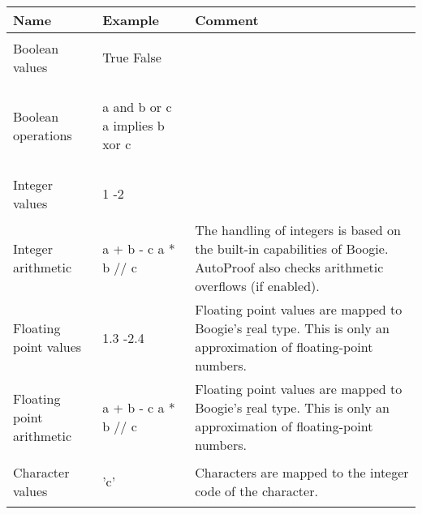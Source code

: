 \noindent
\begin{longtable}{|m{2.7cm}|l|m{6.35cm}|}
\hline
\textbf{Name} & \textbf{Example} & \textbf{Comment} \\ \endhead  \hline

Boolean values
\cellcolor{full}
&
{\begin{erunning}
True
False
\end{erunning}} 
&
\\ \hline

Boolean \newline operations
\cellcolor{full}
&
{\begin{erunning}
a and b or c
a implies b xor c
\end{erunning}} 
&
\\ \hline

Integer values
\cellcolor{full}
&
{\begin{erunning}
1
-2
\end{erunning}} 
&
\\ \hline

Integer \newline arithmetic 
\cellcolor{full}
&
{\begin{erunning}
a + b - c
a * b // c
\end{erunning}} 
&
The handling of integers is based on the built-in capabilities of Boogie. AutoProof also checks arithmetic overflows (if enabled).
\\ \hline

Floating point \newline values
\cellcolor{partial}
&
{\begin{erunning}
1.3
-2.4
\end{erunning}} 
&
Floating point values are mapped to Boogie's \b{real} type. This is only an approximation of floating-point numbers.
\\ \hline

Floating point \newline arithmetic
\cellcolor{partial}
&
{\begin{erunning}
a + b - c
a * b // c
\end{erunning}} 
&
Floating point values are mapped to Boogie's \b{real} type. This is only an approximation of floating-point numbers.
\\ \hline

Character values
\cellcolor{full}
&
{\begin{erunning}
'c'
\end{erunning}} 
&
Characters are mapped to the integer code of the character.
\\ \hline


\end{longtable}
